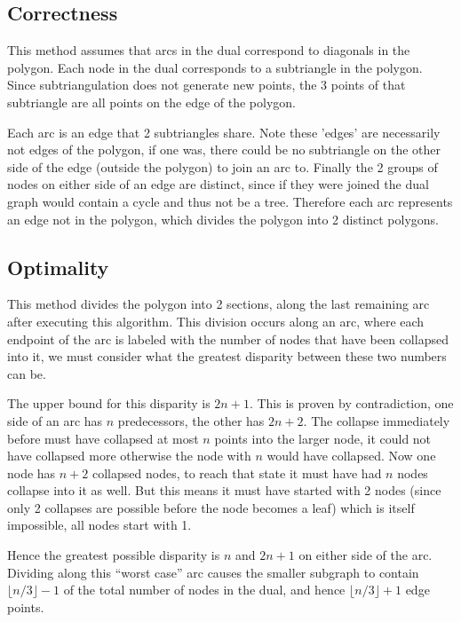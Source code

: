 \subsection{Correctness}
This method assumes that arcs in the dual correspond to diagonals in the polygon.  Each node in the dual corresponds to a subtriangle in the polygon.  Since subtriangulation does not generate new points, the 3 points of that subtriangle are all points on the edge of the polygon.

Each arc is an edge that 2 subtriangles share.
Note these 'edges' are necessarily not edges of the polygon, if one was, there could be no subtriangle on the other side of the edge (outside the polygon) to join an arc to.
Finally the 2 groups of nodes on either side of an edge are distinct, since if they were joined the dual graph would contain a cycle and thus not be a tree.
Therefore each arc represents an edge not in the polygon, which divides the polygon into 2 distinct polygons.

\subsection{Optimality}
This method divides the polygon into 2 sections, along the last remaining arc after executing this algorithm.
This division occurs along an arc, where each endpoint of the arc is labeled with the number of nodes that have been collapsed into it, we must consider what the greatest disparity between these two numbers can be.

The upper bound for this disparity is $2n+1$.  This is proven by contradiction, one side of an arc has $n$ predecessors, the other has $2n+2$.  The collapse immediately before must have collapsed at most $n$ points into the larger node, it could not have collapsed more otherwise the node with $n$ would have collapsed.
Now one node has $n+2$ collapsed nodes, to reach that state it must have had $n$ nodes collapse into it as well.  But this means it must have started with 2 nodes (since only 2 collapses are possible before the node becomes a leaf) which is itself impossible, all nodes start with 1.

Hence the greatest possible disparity is $n$ and $2n+1$ on either side of the arc.  Dividing along this ``worst case'' arc causes the smaller subgraph to contain $\lfloor n / 3 \rfloor - 1$ of the total number of nodes in the dual, and hence $\lfloor n / 3 \rfloor + 1$ edge points.


